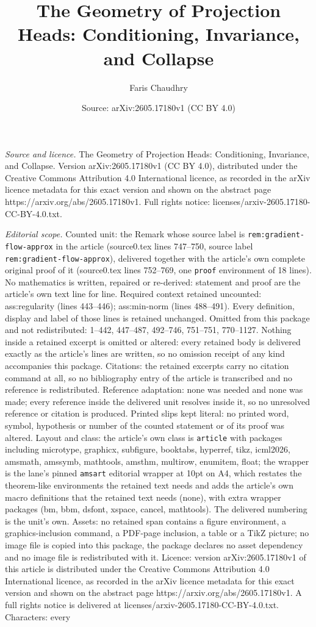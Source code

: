 \documentclass[10pt,a4paper]{amsart}
\title[The Geometry of Projection Heads: Conditioning, Invariance, ]{The Geometry of Projection Heads: Conditioning, Invariance, and Collapse}
\author{Faris Chaudhry}
\date{Source: arXiv:2605.17180v1 (CC BY 4.0)}
\begin{document}
\maketitle

\noindent\emph{Source and licence.} The Geometry of Projection Heads: Conditioning, Invariance, and Collapse. Version arXiv:2605.17180v1 (CC BY 4.0), distributed under the Creative Commons Attribution 4.0 International licence, as recorded in the arXiv licence metadata for this exact version and shown on the abstract page https://arxiv.org/abs/2605.17180v1. Full rights notice: licenses/arxiv-2605.17180-CC-BY-4.0.txt.\par\smallskip

\noindent\textit{Editorial scope.} Counted unit: the Remark whose source label is \texttt{rem:gradient-flow-approx} in the article (source0.tex lines 747--750, source label \texttt{rem:gradient-flow-approx}), delivered together with the article's own complete original proof of it (source0.tex lines 752--769, one \texttt{proof} environment of 18 lines). No mathematics is written, repaired or re-derived: statement and proof are the article's own text line for line. Required context retained uncounted: ass:regularity (lines 443--446); ass:min-norm (lines 488--491). Every definition, display and label of those lines is retained unchanged. Omitted from this package and not redistributed: 1--442, 447--487, 492--746, 751--751, 770--1127. Nothing inside a retained excerpt is omitted or altered: every retained body is delivered exactly as the article's lines are written, so no omission receipt of any kind accompanies this package. Citations: the retained excerpts carry no citation command at all, so no bibliography entry of the article is transcribed and no reference is redistributed. Reference adaptation: none was needed and none was made; every reference inside the delivered unit resolves inside it, so no unresolved reference or citation is produced. Printed slips kept literal: no printed word, symbol, hypothesis or number of the counted statement or of its proof was altered. Layout and class: the article's own class is \texttt{article} with packages including microtype, graphicx, subfigure, booktabs, hyperref, tikz, icml2026, amsmath, amssymb, mathtools, amsthm, multirow, enumitem, float; the wrapper is the lane's pinned \texttt{amsart} editorial wrapper at 10pt on A4, which restates the theorem-like environments the retained text needs and adds the article's own macro definitions that the retained text needs (none), with extra wrapper packages (bm, bbm, dsfont, xspace, cancel, mathtools). The delivered numbering is the unit's own. Assets: no retained span contains a figure environment, a graphics-inclusion command, a PDF-page inclusion, a table or a TikZ picture; no image file is copied into this package, the package declares no asset dependency and no image file is redistributed with it. Licence: version arXiv:2605.17180v1 of this article is distributed under the Creative Commons Attribution 4.0 International licence, as recorded in the arXiv licence metadata for this exact version and shown on the abstract page https://arxiv.org/abs/2605.17180v1. A full rights notice is delivered at licenses/arxiv-2605.17180-CC-BY-4.0.txt. Characters: every 
\end{document}
